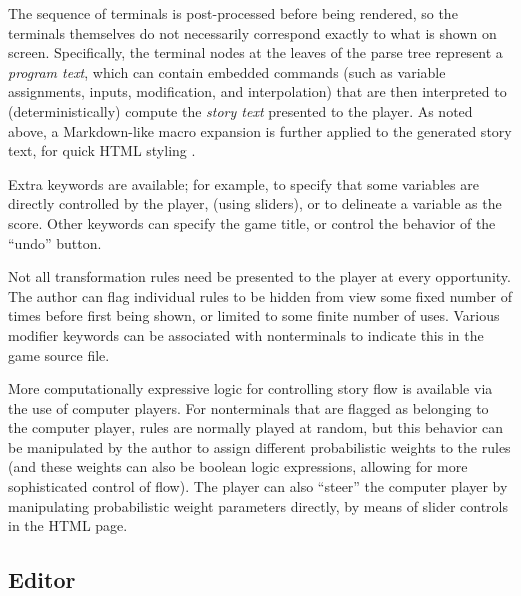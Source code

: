 \documentclass{acm_proc_article-sp}
\begin{document}
The sequence of terminals is post-processed before being rendered,
so the terminals themselves do not necessarily correspond exactly to what is shown on screen.
Specifically, the terminal nodes at the leaves of the parse tree represent a {\em program text},
which can contain embedded commands (such as variable assignments, inputs, modification, and interpolation)
that are then interpreted to (deterministically) compute the {\em story text} presented to the player.
As noted above, a Markdown-like macro expansion is further applied to the generated story text,
for quick HTML styling \cite{Markdown}.

Extra keywords are available; for example, to specify that some variables are directly controlled by the player,
(using sliders), or to delineate a variable as the score.
Other keywords can specify the game title, or control the behavior of the ``undo'' button.

Not all transformation rules need be presented to the player at every opportunity.
The author can flag individual rules to be hidden from view some fixed number of times
before first being shown, or limited to some finite number of uses.
Various modifier keywords can be associated with nonterminals to indicate this in the game source file.

More computationally expressive logic for controlling story flow is available via the use of computer players.
For nonterminals that are flagged as belonging to the computer player,
rules are normally played at random,
but this behavior can be manipulated by the author to
assign different probabilistic weights to the rules
(and these weights can also be boolean logic expressions, allowing for more sophisticated control of flow).
The player can also ``steer'' the computer player by manipulating probabilistic weight parameters directly,
by means of slider controls in the HTML page.

\subsection{Editor}
\end{document}
